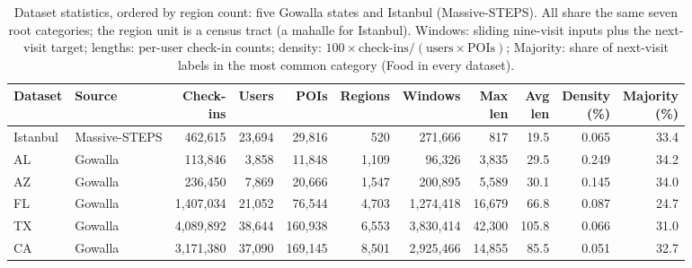 \begin{table}[htbp]
\caption{Dataset statistics, ordered by region count: five Gowalla states and Istanbul
(Massive-STEPS). All share the same seven root categories; the region unit is a census
tract (a mahalle for Istanbul). Windows: sliding nine-visit inputs plus the next-visit
target; lengths: per-user check-in counts; density: $100\times\text{check-ins}/(\text{users}\times\text{POIs})$; Majority: share of next-visit
labels in the most common category (Food in every dataset).}
\label{tab:mobiwac:datasets}
\centering
\setlength{\tabcolsep}{3pt}
\begin{adjustbox}{max width=\textwidth}
\begin{tabular}{l l r r r r r r r r r}
\toprule
\textbf{Dataset} & \textbf{Source} & \shortstack[r]{\textbf{Check-}\\\textbf{ins}} & \textbf{Users} & \textbf{POIs} &
\textbf{Regions} & \textbf{Windows} & \shortstack[r]{\textbf{Max}\\\textbf{len}} & \shortstack[r]{\textbf{Avg}\\\textbf{len}} & \shortstack[r]{\textbf{Density}\\\textbf{(\%)}} & \shortstack[r]{\textbf{Majority}\\\textbf{(\%)}} \\
\midrule
Istanbul & Massive-STEPS &   462{,}615 & 23{,}694 &  29{,}816 &     520 &   271{,}666 &     817 &  19.5 & 0.065 & 33.4 \\
AL       & Gowalla       &   113{,}846 &  3{,}858 &  11{,}848 & 1{,}109 &    96{,}326 & 3{,}835 &  29.5 & 0.249 & 34.2 \\
AZ       & Gowalla       &   236{,}450 &  7{,}869 &  20{,}666 & 1{,}547 &   200{,}895 & 5{,}589 &  30.1 & 0.145 & 34.0 \\
FL       & Gowalla       & 1{,}407{,}034 & 21{,}052 &  76{,}544 & 4{,}703 & 1{,}274{,}418 & 16{,}679 &  66.8 & 0.087 & 24.7 \\
TX       & Gowalla       & 4{,}089{,}892 & 38{,}644 & 160{,}938 & 6{,}553 & 3{,}830{,}414 & 42{,}300 & 105.8 & 0.066 & 31.0 \\
CA       & Gowalla       & 3{,}171{,}380 & 37{,}090 & 169{,}145 & 8{,}501 & 2{,}925{,}466 & 14{,}855 &  85.5 & 0.051 & 32.7 \\
\bottomrule
\end{tabular}
\end{adjustbox}
\end{table}
